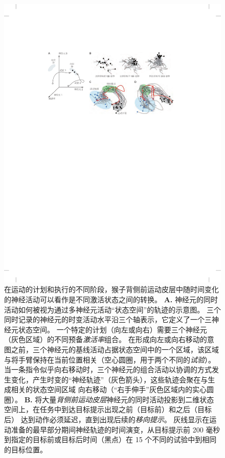 \begin{figure}[htbp]
	\centering
	\includegraphics[width=0.95\linewidth]{chap34/fig_34_10}
	\caption{在运动的计划和执行的不同阶段，猴子背侧前运动皮层中随时间变化的神经活动可以看作是不同激活状态之间的转换。
		\textbf{A.} 神经元的同时活动如何被视为通过多神经元活动“状态空间”的轨迹的示意图。
		三个同时记录的神经元的时变活动水平沿三个轴表示，它定义了一个三神经元状态空间。
		一个特定的计划（向左或向右）需要三个神经元（灰色区域）的不同预备\textit{激活率}组合。
		在形成向左或向右移动的意图之前，三个神经元的基线活动占据状态空间中的一个区域，该区域与将手臂保持在当前位置相关（空心圆圈，用于两个不同的\textit{试验}）。
		当一条指令似乎向右移动时，三个神经元的组合活动以协调的方式发生变化，产生时变的“神经轨迹”（灰色箭头），这些轨迹会聚在与生成相关的状态空间区域 向右移动（“右手伸手”灰色区域内的实心圆圈）。
		\textbf{B.} 将大量\textit{背侧前运动皮层}神经元的同时活动投影到二维状态空间上，在任务中到达目标提示出现之前（目标前）和之后（目标后） 达到动作必须延迟，直到出现后续的\textit{移向提示}。
		灰线显示在运动准备的最早部分期间神经轨迹的时间演变，从目标提示前 200 毫秒到指定的目标前或目标后时间（黑点）在 15 个不同的试验中到相同的目标位置。
}
\end{figure}
